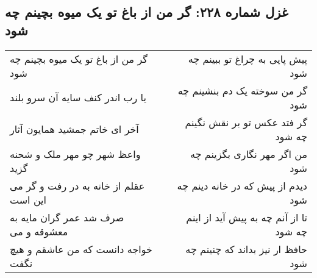 \begin{center}
\section*{غزل شماره ۲۲۸: گر من از باغ تو یک میوه بچینم چه شود}
\label{sec:sh228}
\begin{longtable}{l p{0.5cm} r}
گر من از باغ تو یک میوه بچینم چه شود
&&
پیش پایی به چراغ تو ببینم چه شود
\\
یا رب اندر کنف سایه آن سرو بلند
&&
گر من سوخته یک دم بنشینم چه شود
\\
آخر ای خاتم جمشید همایون آثار
&&
گر فتد عکس تو بر نقش نگینم چه شود
\\
واعظ شهر چو مهر ملک و شحنه گزید
&&
من اگر مهر نگاری بگزینم چه شود
\\
عقلم از خانه به در رفت و گر می این است
&&
دیدم از پیش که در خانه دینم چه شود
\\
صرف شد عمر گران مایه به معشوقه و می
&&
تا از آنم چه به پیش آید از اینم چه شود
\\
خواجه دانست که من عاشقم و هیچ نگفت
&&
حافظ ار نیز بداند که چنینم چه شود
\\
\end{longtable}
\end{center}

